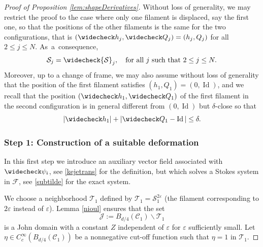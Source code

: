 \documentclass[JEP,XML,SOM,Unicode, NoEqCountersInSection,NoFloatCountersInSection,published]{cedram}
\let\eps\varepsilon
\DeclareMathOperator{\Id}{Id}
\theoremstyle{definition}
\theoremstyle{remark}
\begin{document}
\begin{proof}[Proof of Proposition \ref{lem:shapeDerivatives}]
Without loss of generality, we may restrict the proof to the case where only one filament is displaced, say the first one, so that the positions of the other filaments is the same for the two configurations, that is $(\widecheck h_j, \widecheck Q_j) = (h_j,Q_j)$ for all $2 \leq j \leq N$. As~a~consequence,
\begin{equation}
\label{lezautre}
{\mathcal S}_j = \widecheck {\mathcal S}_j, \quad\text{for all $j$ such that } 2 \leq j \leq N.
\end{equation}
Moreover, up to a change of frame, we may also assume without loss of generality that the position of the first filament satisfies $(h_1,Q_1) = (0,\Id)$, and we recall that the position $(\widecheck h_1, \widecheck Q_1)$ of the first filament in the second configuration is in general different from $(0,\Id)$ but $\delta$-close so that
\begin{equation} \label{delta-c}
|\widecheck h_1 | + |\widecheck Q_1 - \Id | \leq \delta.
\end{equation}

\subsubsection*{Step 1: Construction of a suitable deformation}
In this first step we introduce an auxiliary vector field associated with $\widecheck \psi_i$, see \eqref{kejetrans} for the definition, but which solves a Stokes system in $\mathcal F$, see \eqref{subtilde} for the exact system.

We choose a neighborhood $\mathcal T_1$ defined by $\mathcal T_1 = \mathcal S_1^{2\eps}$ (\ie the filament corresponding to $2 \eps$ instead of $\eps$). Lemma \ref{nioul} ensures that the set
\begin{equation} \label{J}
\mathcal J := B_{d/4}(\mathcal C_1) \smallsetminus \mathcal T_1
\end{equation}
is a John domain with a constant $Z$ independent of $\eps$ for $\eps$ sufficiently small.
Let $\eta \in C_c^{\infty}(B_{d/4}(\mathcal C_1))$ be a nonnegative cut-off function such that
$\eta = 1$ in $\mathcal T_1$.


\end{proof}
\end{document}
